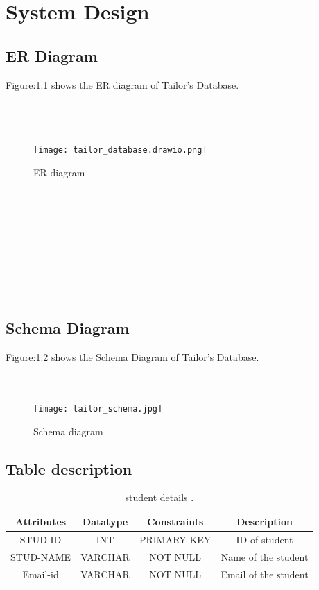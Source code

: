 \documentclass[12pt, letter paper]{report}
\begin{document}
{\chapter{System Design}
\section{ER Diagram} 
Figure:\ref{fig:tailor_database.drawio.png} shows the ER diagram of Tailor's Database.
\\
\\
\\
\\
\begin{figure}[h]
 \centering
 \texttt{[image: tailor\_database.drawio.png]}
 \caption{ER diagram}
 \label{fig:tailor_database.drawio.png}
\end{figure}
\\
\\
\\
\\
\\
\\
\\
\\
\section{Schema Diagram} 
Figure:\ref{fig:tailor_schema.jpg} shows the Schema Diagram of Tailor's Database.
\\
\\
\\
\begin{figure}[h]
 \centering
 \texttt{[image: tailor\_schema.jpg]}
 \caption{Schema diagram}
 \label{fig:tailor_schema.jpg}
\end{figure}
\section{Table description} 
\begin{center}
\begin{table}[h!]
\centering
    \begin{tabular}{|c|c|c|c|}
    \hline
      Attributes &Datatype &Constraints&Description  \\
      \hline
      \hline
         STUD-ID&INT&PRIMARY KEY&ID of student  \\
         \hline
         STUD-NAME&VARCHAR&NOT NULL& Name of the student\\ 
         \hline
         Email-id&VARCHAR&NOT NULL& Email of the student\\ 
         \hline
    \end{tabular}
    \caption{student details .}
\label{table:1}
    \end{table}
\end{center}

}
\end{document}
